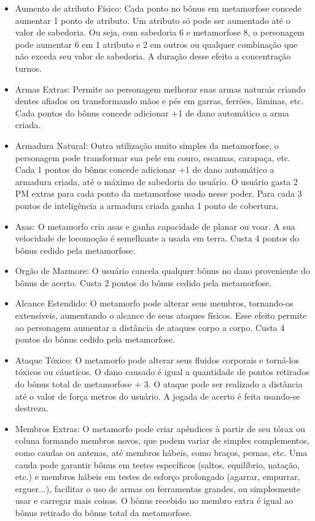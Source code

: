 \begin{itemize}
	\item Aumento de atributo Físico: Cada ponto no bônus em metamorfose concede aumentar 1 ponto de atributo. Um atributo só pode ser aumentado até o valor de sabedoria. Ou seja, com sabedoria 6 e metamorfose 8, o personagem pode aumentar 6 em 1 atributo e 2 em outros ou qualquer combinação que não exceda seu valor de sabedoria. A duração desse efeito a concentração turnos.

	\item 		Armas Extras: Permite ao personagem melhorar suas armas naturais criando dentes afiados ou transformando mãos e pés em garras, ferrões, lâminas, etc. Cada pontos do bônus concede adicionar +1 de dano automático a arma criada.

		\item 	Armadura Natural: Outra utilização muito simples da metamorfose, o personagem pode transformar sua pele em couro, escamas, carapaça, etc. Cada 1 pontos do bônus concede adicionar +1 de dano automático a armadura criada, até o máximo de sabedoria do usuário. O usuário gasta 2 PM extras para cada ponto da metamorfose usado nesse poder. Para cada 3 pontos de inteligência a armadura criada ganha 1 ponto de cobertura.

	\item 		Asas: O metamorfo cria asas e ganha capacidade de planar ou voar. A sua velocidade de locomoção é semelhante a usada em terra. Custa 4 pontos do bônus cedido pela metamorfose.
	
	\item 		Orgão de Marmore:  O usuário cancela qualquer bônus no dano proveniente do bônus de acerto. Custa 2 pontos do bônus cedido pela metamorfose.

	\item 		Alcance Estendido: O metamorfo pode alterar seus membros, tornando-os extensíveis, aumentando o alcance de seus ataques físicos. Esse efeito permite ao personagem aumentar a distância de ataques corpo a corpo. Custa 4 pontos do bônus cedido pela metamorfose.

	\item 		Ataque Tóxico: O metamorfo pode alterar seus fluidos corporais e torná-los tóxicos ou cáusticos. O dano causado é igual a quantidade de pontos retirados do bônus total de metamorfose + 3. O ataque pode ser realizado a distância até o valor de força metros do usuário. A jogada de acerto é feita usando-se destreza. 

	\item 		Membros Extras: O metamorfo pode criar apêndices à partir de seu tórax ou coluna formando membros novos, que podem variar de simples complementos, como caudas ou antenas, até membros hábeis, como braços, pernas, etc. Uma cauda pode garantir bônus em testes específicos (saltos, equilíbrio, natação, etc.) e membros hábeis em testes de esforço prolongado (agarrar, empurrar, erguer...), facilitar o uso de armas ou ferramentas grandes, ou simplesmente usar e carregar mais coisas. O bônus recebido no membro extra é igual ao bônus retirado do bônus total da metamorfose.


\end{itemize}

